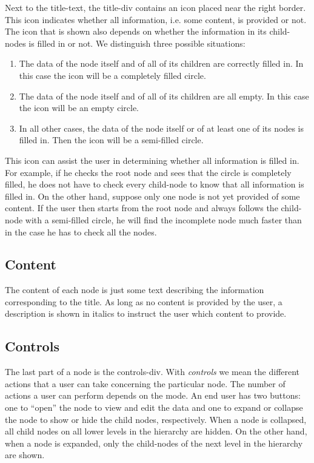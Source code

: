 Next to the title-text, the title-div contains an icon placed near the right border. This icon indicates whether all information, i.e. some content, is provided or not. The icon that is shown also depends on whether the information in its child-nodes is filled in or not. We distinguish three possible situations:
\begin{enumerate}
	\item The data of the node itself and of all of its children are correctly filled in. In this case the icon will be a completely filled circle.
	\item The data of the node itself and of all of its children are all empty. In this case the icon will be an empty circle.
	\item In all other cases, the data of the node itself or of at least one of its nodes is filled in. Then the icon will be a semi-filled circle.
\end{enumerate}
This icon can assist the user in determining whether all information is filled in. For example, if he checks the root node and sees that the circle is completely filled, he does not have to check every child-node to know that all information is filled in. On the other hand, suppose only one node is not yet provided of some content. If the user then starts from the root node and always follows the child-node with a semi-filled circle, he will find the incomplete node much faster than in the case he has to check all the nodes.



\subsection{Content}\label{sec:content}
The content of each node is just some text describing the information corresponding to the title. As long as no content is provided by the user, a description is shown in italics to instruct the user which content to provide.



\subsection{Controls}\label{sec:controls}
The last part of a node is the controls-div. With \textit{controls} we mean the different actions that a user can take concerning the particular node. The number of actions a user can perform depends on the mode. An end user has two buttons: one to ``open'' the node to view and edit the data and one to expand or collapse the node to show or hide the child nodes, respectively. When a node is collapsed, all child nodes on all lower levels in the hierarchy are hidden. On the other hand, when a node is expanded, only the child-nodes of the next level in the hierarchy are shown.\\

